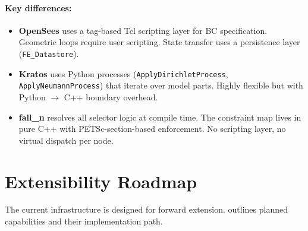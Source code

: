\paragraph{Key differences:}
\begin{itemize}[nosep]
  \item \textbf{OpenSees} uses a tag-based Tcl scripting layer for BC
        specification.  Geometric loops require user scripting.  State transfer
        uses a persistence layer (\texttt{FE\_Datastore}).
  \item \textbf{Kratos} uses Python processes (\texttt{ApplyDirichletProcess},
        \texttt{ApplyNeumannProcess}) that iterate over model parts.
        Highly flexible but with Python $\to$ C++ boundary overhead.
  \item \textbf{fall\_n} resolves all selector logic at compile time.
        The constraint map lives in pure C++ with PETSc-section-based
        enforcement.  No scripting layer, no virtual dispatch per node.
\end{itemize}


\section{Extensibility Roadmap}
\label{sec:bc-extensibility}

The current infrastructure is designed for forward extension.
 outlines planned capabilities and their
implementation path.

